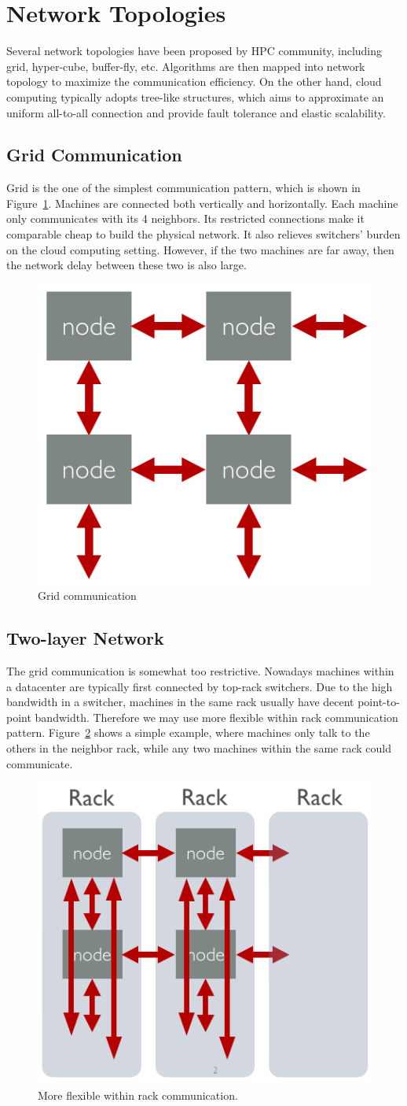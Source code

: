 \documentclass{acm_proc_article-sp}
\begin{document}
\section{Network Topologies}
\label{sec:network-topologies}

Several network topologies have been proposed by HPC community, including grid,
hyper-cube, buffer-fly, etc. Algorithms are then mapped into network topology to
maximize the communication efficiency. On the other hand, cloud computing
typically adopts
tree-like structures, which aims to approximate an uniform all-to-all connection
and provide fault tolerance and elastic scalability.

\subsection{Grid Communication}

Grid is the one of the simplest communication pattern, which is shown in
Figure~\ref{fig:grid2}. Machines are connected both vertically and
horizontally. Each machine only communicates with its 4 neighbors. Its
restricted connections make it comparable cheap to build the physical
network. It also relieves switchers' burden on the cloud computing setting.
However, if the two machines are far away, then the network delay between these
two is also large.

\begin{figure}[th!]
  \centering
  \includegraphics[width=.25\textwidth]{fig/grid}
  \caption{Grid communication}
  \label{fig:grid2}
\end{figure}

\subsection{Two-layer Network}

The grid communication is somewhat too restrictive. Nowadays machines within a
datacenter are typically first connected by top-rack switchers. Due to the high
bandwidth in a switcher, machines in the same rack usually have decent
point-to-point bandwidth. Therefore we may use more flexible within rack
communication pattern. Figure~\ref{fig:rack} shows a simple example, where
machines only talk to the others in the neighbor rack, while any two machines
within the same rack could communicate.
\begin{figure}[th!]
  \centering
  \includegraphics[width=.25\textwidth]{fig/rack}
  \caption{More flexible within rack communication.}
  \label{fig:rack}
\end{figure}
\end{document}
